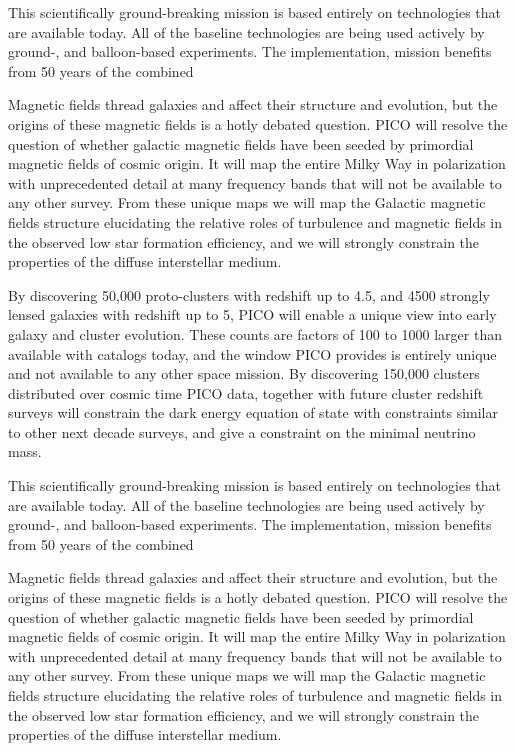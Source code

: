 \documentclass[PICOReport.tex]{subfiles}
\begin{document}
This scientifically ground-breaking mission is based entirely on technologies that are available today. All of the baseline technologies are being used actively by ground-, and balloon-based experiments. The implementation, mission benefits from 50 years of the combined 

Magnetic fields thread galaxies and affect their structure and evolution, but the origins of these magnetic fields is a hotly debated question. PICO will resolve the question of whether galactic magnetic fields have been seeded by primordial magnetic fields of cosmic origin. It will map the entire Milky Way in polarization with unprecedented detail at many frequency bands that will not be available to any other survey. From these unique maps we will map the Galactic magnetic fields structure elucidating the relative roles of turbulence and magnetic fields in the observed low star formation efficiency, and we will strongly constrain the properties of the diffuse interstellar medium. 

By discovering 50,000 proto-clusters with redshift up to 4.5, and  4500 strongly lensed galaxies with redshift up to 5, PICO will enable a unique view into early galaxy and cluster evolution. These counts are factors of 100 to 1000 larger than available with catalogs today, and the window PICO provides is entirely unique and not available to any other space mission. By discovering 150,000 clusters distributed over cosmic time PICO data, together with future cluster redshift surveys will constrain the dark energy equation of state with constraints similar to other next decade surveys, and give a constraint on the minimal neutrino mass. 

This scientifically ground-breaking mission is based entirely on technologies that are available today. All of the baseline technologies are being used actively by ground-, and balloon-based experiments. The implementation, mission benefits from 50 years of the combined 

Magnetic fields thread galaxies and affect their structure and evolution, but the origins of these magnetic fields is a hotly debated question. PICO will resolve the question of whether galactic magnetic fields have been seeded by primordial magnetic fields of cosmic origin. It will map the entire Milky Way in polarization with unprecedented detail at many frequency bands that will not be available to any other survey. From these unique maps we will map the Galactic magnetic fields structure elucidating the relative roles of turbulence and magnetic fields in the observed low star formation efficiency, and we will strongly constrain the properties of the diffuse interstellar medium. 
\end{document}
